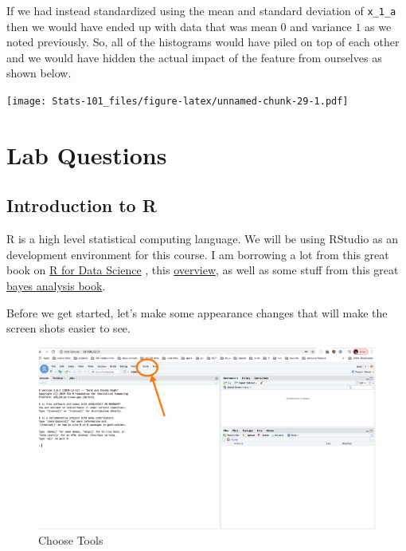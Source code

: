 \documentclass[]{book}
\begin{document}
If we had instead standardized using the mean and standard deviation of \texttt{x\_1\_a} then we would have ended up with data that was mean \(0\) and variance \(1\) as we noted previously. So, all of the histograms would have piled on top of each other and we would have hidden the actual impact of the feature from ourselves as shown below.

\texttt{[image: Stats-101\_files/figure-latex/unnamed-chunk-29-1.pdf]}

\hypertarget{lab-questions}{%
\section{Lab Questions}\label{lab-questions}}

\hypertarget{introduction-to-r}{%
\subsection{Introduction to R}\label{introduction-to-r}}

R is a high level statistical computing language. We will be using RStudio as an development environment for this course. I am borrowing a lot from this great book on \href{https://r4ds.had.co.nz/index.html}{R for Data Science} , this \href{https://github.com/CerebralMastication/r_for_the_student}{overview}, as well as some stuff from this great \href{https://bookdown.org/content/3686/the-r-programming-language.html}{bayes analysis book}.

Before we get started, let's make some appearance changes that will make the screen shots easier to see.

\begin{figure}
\centering
\includegraphics{./pics/lab1_ss1.png}
\caption{Choose Tools}
\end{figure}
\end{document}
